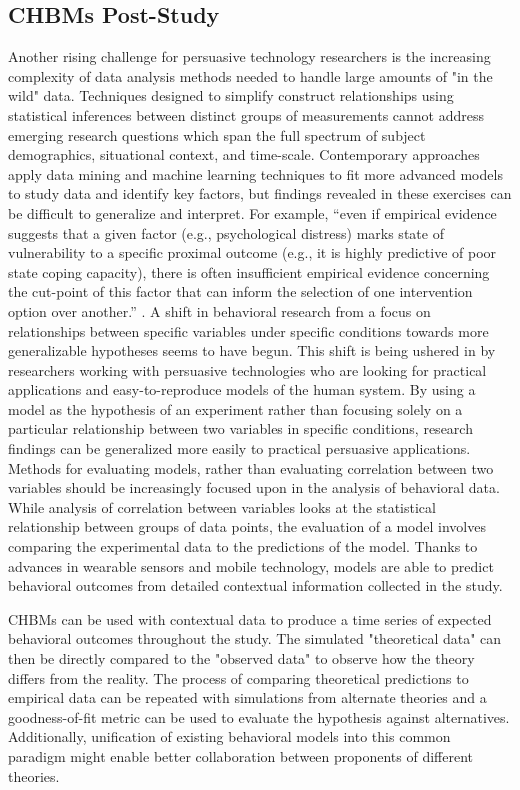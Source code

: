 \documentclass[runningheads,a4paper]{llncs}
\begin{document}
\subsection{CHBMs Post-Study}
Another rising challenge for persuasive technology researchers is the increasing complexity of data analysis methods needed to handle large amounts of "in the wild" data.
Techniques designed to simplify construct relationships using statistical inferences between distinct groups of measurements cannot address emerging research questions which span the full spectrum of subject demographics, situational context, and time-scale. 
Contemporary approaches apply data mining and machine learning techniques to fit more advanced models to study data and identify key factors, but findings revealed in these exercises can be difficult to generalize and interpret.
For example, “even if empirical evidence suggests that a given factor (e.g., psychological distress) marks state of vulnerability to a specific proximal outcome (e.g., it is highly predictive of poor state coping capacity), there is often insufficient empirical evidence concerning the cut-point of this factor that can inform the selection of one intervention option over another.” \cite{nahum2014}.
A shift in behavioral research from a focus on relationships between specific variables under specific conditions towards more generalizable hypotheses seems to have begun. 
This shift is being ushered in by researchers working with persuasive technologies who are looking for practical applications and easy-to-reproduce models of the human system.
By using a model as the hypothesis of an experiment rather than focusing solely on a particular relationship between two variables in specific conditions, research findings can be generalized more easily to practical persuasive applications.
Methods for evaluating models, rather than evaluating correlation between two variables should be increasingly focused upon in the analysis of behavioral data.
While analysis of correlation between variables looks at the statistical relationship between groups of data points, the evaluation of a model involves comparing the experimental data to the predictions of the model.
Thanks to advances in wearable sensors and mobile technology, models are able to predict behavioral outcomes from detailed contextual information collected in the study.


CHBMs can be used with contextual data to produce a time series of expected behavioral outcomes throughout the study.
The simulated "theoretical data" can then be directly compared to the "observed data" to observe how the theory differs from the reality.
The process of comparing theoretical predictions to empirical data can be repeated with simulations from alternate theories and a goodness-of-fit metric can be used to evaluate the hypothesis against alternatives.
Additionally, unification of existing behavioral models into this common paradigm might enable better collaboration between proponents of different theories.
\end{document}
